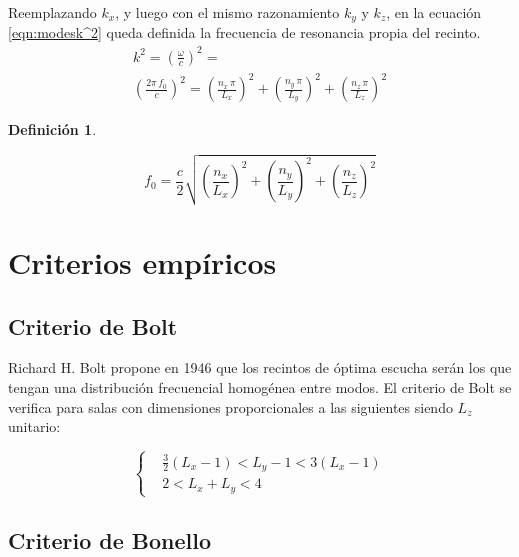 \documentclass[a5paper,12pt,twoside]{book}
\newtheorem{defn}{{Definición}}[chapter]
\begin{document}
Reemplazando $k_x$, y luego con el mismo razonamiento $k_y$ y $k_z$, en la ecuación \ref{eqn:modesk^2} queda definida la frecuencia de resonancia propia del recinto.
\begin{gather*}
    k^2 = \left( \frac{\omega}{c} \right)^2 =
    \\
    \left( \frac{2\pi\,f_0}{c} \right)^2
    = \left( \frac{n_x \, \pi}{L_x} \right)^2 + \left( \frac{n_y \, \pi}{L_y} \right)^2 + \left( \frac{n_z \, \pi}{L_z} \right)^2
\end{gather*}

\begin{mdframed}[style=MyFrame1]
    \begin{defn}
    \end{defn}
    \begin{equation*}
        f_0 = \frac{c}{2} \sqrt{\left(\frac{n_x}{L_x}\right)^2 + \left(\frac{n_y}{L_y}\right)^2 + \left(\frac{n_z}{L_z}\right)^2}
    \end{equation*}
\end{mdframed}


\section{Criterios empíricos}


\subsection{Criterio de Bolt}

Richard H. Bolt propone en 1946 que los recintos de óptima escucha serán los que tengan una distribución frecuencial homogénea entre modos.
El criterio de Bolt se verifica para salas con dimensiones proporcionales a las siguientes siendo $L_z$ unitario:

\begin{equation*}
    \left\{
    \begin{aligned}
        & \frac{3}{2} \left( L_x-1 \right) < L_y -1 < 3 \left( L_x-1 \right)
        \\
        & 2 < L_x+L_y < 4
    \end{aligned}
    \right.
\end{equation*}


\subsection{Criterio de Bonello}
\end{document}
